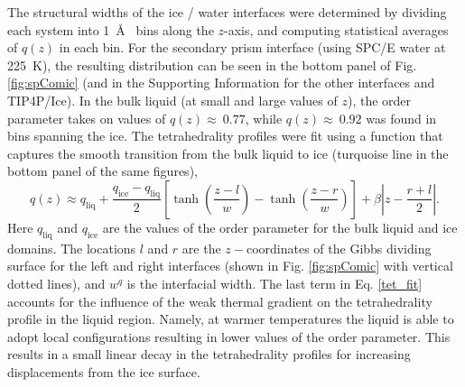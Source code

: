 The structural widths of the ice / water interfaces were determined by
dividing each system into 1~\AA~ bins along the $z$-axis, and
computing statistical averages of $q(z)$ in each bin. For the
secondary prism interface (using SPC/E water at 225~K), the resulting
distribution can be seen in the bottom panel of Fig. \ref{fig:spComic}
(and in the Supporting Information for the other interfaces and
TIP4P/Ice). In the bulk liquid (at small and large values of $z$), the
order parameter takes on values of $q(z) \approx~0.77$, while
$q(z) \approx~0.92$ was found in bins spanning the ice. The
tetrahedrality profiles were fit using a function that captures the
smooth transition from the bulk liquid to ice (turquoise line in the
bottom panel of the same figures),
\begin{equation}\label{tet_fit}
q(z) \approx
q_\mathrm{liq}+\frac{q_\mathrm{ice}-q_\mathrm{liq}}{2}\left[\tanh\left(\frac{z-l}{w}\right)-\tanh\left(\frac{z-r}{w}\right)\right]+\beta\left|z-\frac{r+l}{2}\right|.
\end{equation}
Here $q_\mathrm{liq}$ and $q_\mathrm{ice}$ are the values of the order
parameter for the bulk liquid and ice domains. The locations $l$ and
$r$ are the $z-$coordinates of the Gibbs dividing surface for the left
and right interfaces (shown in Fig. \ref{fig:spComic} with vertical
dotted lines), and $w^{q}$ is the interfacial width.  The last term in
Eq. \eqref{tet_fit} accounts for the influence of the weak thermal
gradient on the tetrahedrality profile in the liquid region. Namely,
at warmer temperatures the liquid is able to adopt local
configurations resulting in lower values of the order parameter. This
results in a small linear decay in the tetrahedrality profiles for
increasing displacements from the ice surface.

